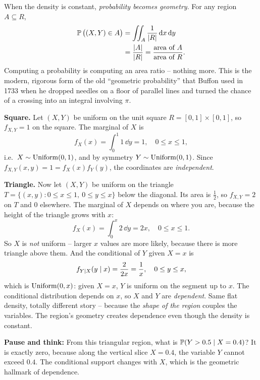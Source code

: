 \begin{happeningbox}
When the density is constant, \emph{probability becomes geometry}. For any region
$A\subseteq R$,
\begin{align*}
  \operatorname{\mathbb{P}}\big((X,Y)\in A\big) &= \iint_A \frac{1}{\lvert R\rvert}\,\mathrm{d} x\,\mathrm{d} y \\
  &= \frac{\lvert A\rvert}{\lvert R\rvert} = \frac{\text{area of } A}{\text{area of } R}.
\end{align*}
Computing a probability is computing an area ratio -- nothing more. This is the
modern, rigorous form of the old ``geometric probability'' that Buffon used in
1733 when he dropped needles on a floor of parallel lines and turned the chance
of a crossing into an integral involving $\pi$.
\end{happeningbox}

\begin{example}
\label{ch13:ex-uniform-square-triangle}
\textbf{Square.} Let $(X,Y)$ be uniform on the unit square
$R=[0,1]\times[0,1]$, so $f_{X,Y}=1$ on the square. The marginal of $X$ is
\[
  f_X(x) = \int_0^1 1\,\dd y = 1, \quad 0\le x\le 1,
\]
i.e.\ $X\sim\operatorname{Uniform}(0,1)$, and by symmetry $Y\sim\operatorname{Uniform}(0,1)$. Since
$f_{X,Y}(x,y) = 1 = f_X(x)f_Y(y)$, the coordinates are \emph{independent}.

\textbf{Triangle.} Now let $(X,Y)$ be uniform on the triangle
$T=\{(x,y): 0\le x\le 1,\ 0\le y\le x\}$ below the diagonal. Its area is
$\tfrac12$, so $f_{X,Y}=2$ on $T$ and $0$ elsewhere. The marginal of $X$ depends
on where you are, because the height of the triangle grows with $x$:
\[
  f_X(x) = \int_0^x 2\,\dd y = 2x, \quad 0\le x\le 1.
\]
So $X$ is \emph{not} uniform -- larger $x$ values are more likely, because there
is more triangle above them. And the conditional of $Y$ given $X=x$ is
\[
  f_{Y\mid X}(y\mid x) = \frac{2}{2x} = \frac1x, \quad 0\le y\le x,
\]
which is $\operatorname{Uniform}(0,x)$: given $X=x$, $Y$ is uniform on the segment up to $x$. The
conditional distribution depends on $x$, so $X$ and $Y$ are \emph{dependent}.
Same flat density, totally different story -- because the \emph{shape of the
region} couples the variables. The region's geometry creates dependence even
though the density is constant.

\textbf{Pause and think:} From this triangular region, what is
$\operatorname{\mathbb{P}}(Y > 0.5 \mid X = 0.4)$? It is exactly zero, because along the vertical
slice $X=0.4$, the variable $Y$ cannot exceed $0.4$. The conditional support
changes with $X$, which is the geometric hallmark of dependence.
\end{example}


